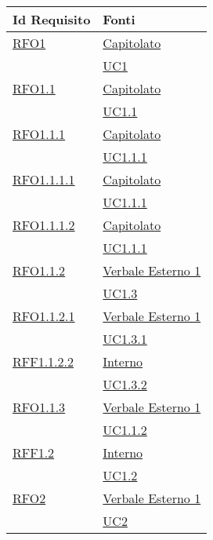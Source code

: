 \normalsize
\begin{longtable}{|>{\centering}m{5cm}|m{5cm}<{\centering}|}
\hline
\textbf{Id Requisito} & \textbf{Fonti}\\
\hline
\endhead
\hyperlink{RFO1}{RFO1} & \hyperlink{Capitolato}{Capitolato}\\
& \hyperref[UC1]{UC1}\\ \hline

\hyperlink{RFO1.1}{RFO1.1} & \hyperlink{Capitolato}{Capitolato}\\
& \hyperref[UC1.1]{UC1.1}\\ \hline

\hyperlink{RFO1.1.1}{RFO1.1.1} & \hyperlink{Capitolato}{Capitolato}\\
& \hyperref[UC1.1.1]{UC1.1.1}\\ \hline

\hyperlink{RFO1.1.1.1}{RFO1.1.1.1} & \hyperlink{Capitolato}{Capitolato}\\
& \hyperref[UC1.1.1]{UC1.1.1}\\ \hline

\hyperlink{RFO1.1.1.2}{RFO1.1.1.2} & \hyperlink{Capitolato}{Capitolato}\\
& \hyperref[UC1.1.1]{UC1.1.1}\\ \hline

\hyperlink{RFO1.1.2}{RFO1.1.2} & \hyperlink{Verbale Esterno 1}{Verbale Esterno 1}\\
& \hyperref[UC1.3]{UC1.3}\\ \hline

\hyperlink{RFO1.1.2.1}{RFO1.1.2.1} & \hyperlink{Verbale Esterno 1}{Verbale Esterno 1}\\
& \hyperref[UC1.3.1]{UC1.3.1}\\ \hline

\hyperlink{RFF1.1.2.2}{RFF1.1.2.2} & \hyperlink{Interno}{Interno}\\
& \hyperref[UC1.3.2]{UC1.3.2}\\ \hline

\hyperlink{RFO1.1.3}{RFO1.1.3} & \hyperlink{Verbale Esterno 1}{Verbale Esterno 1}\\
& \hyperref[UC1.1.2]{UC1.1.2}\\ \hline

\hyperlink{RFF1.2}{RFF1.2} & \hyperlink{Interno}{Interno}\\
& \hyperref[UC1.2]{UC1.2}\\ \hline

\hyperlink{RFO2}{RFO2} & \hyperlink{Verbale Esterno 1}{Verbale Esterno 1}\\
& \hyperref[UC2]{UC2}\\ \hline


\end{longtable}
